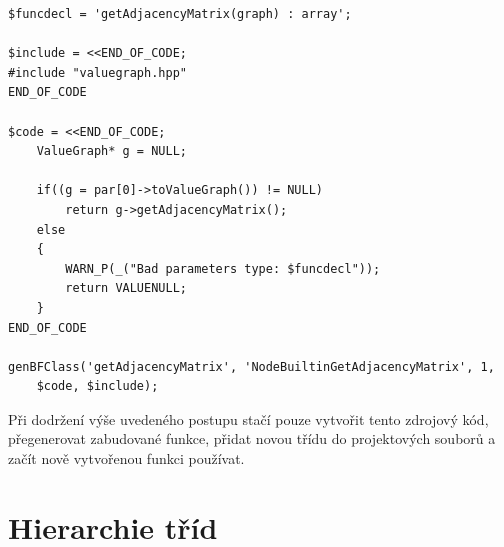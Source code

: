\documentclass[11pt,twoside,a4paper]{book}
\begin{document}
\begin{verbatim}
$funcdecl = 'getAdjacencyMatrix(graph) : array';

$include = <<END_OF_CODE;
#include "valuegraph.hpp"
END_OF_CODE

$code = <<END_OF_CODE;
    ValueGraph* g = NULL;

    if((g = par[0]->toValueGraph()) != NULL)
        return g->getAdjacencyMatrix();
    else
    {
        WARN_P(_("Bad parameters type: $funcdecl"));
        return VALUENULL;
    }
END_OF_CODE

genBFClass('getAdjacencyMatrix', 'NodeBuiltinGetAdjacencyMatrix', 1,
    $code, $include);
\end{verbatim}

Při dodržení výše uvedeného postupu stačí pouze vytvořit tento zdrojový kód, přegenerovat zabudované funkce, přidat novou třídu do projektových souborů a začít nově vytvořenou funkci používat.



\twocolumn

\chapter{Hierarchie tříd}
\end{document}
